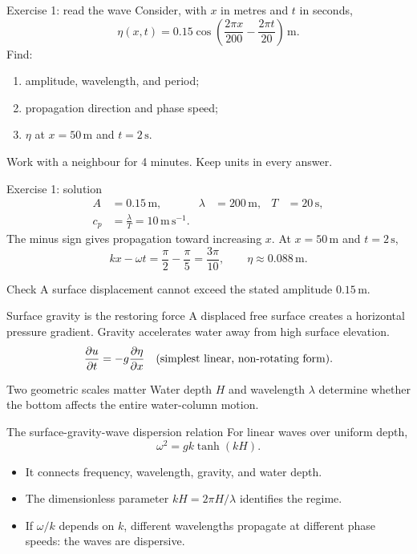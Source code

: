 \documentclass[aspectratio=169]{beamer}
\newcommand{\unit}[1]{\,\mathrm{#1}}
\begin{document}
\begin{frame}{Exercise 1: read the wave}
  Consider, with $x$ in metres and $t$ in seconds,
  \[
    \eta(x,t)=0.15\cos\left(\frac{2\pi x}{200}-\frac{2\pi t}{20}\right)\unit{m}.
  \]
  Find:
  \begin{enumerate}
    \item amplitude, wavelength, and period;
    \item propagation direction and phase speed;
    \item $\eta$ at $x=50\unit{m}$ and $t=2\unit{s}$.
  \end{enumerate}
  \vfill
  Work with a neighbour for 4 minutes. Keep units in every answer.
\end{frame}

\begin{frame}{Exercise 1: solution}
  \begin{align*}
    A &= 0.15\unit{m}, & \lambda &= 200\unit{m}, & T &= 20\unit{s},\\
    c_p &= \frac{\lambda}{T}=10\unit{m\,s^{-1}}.&&&
  \end{align*}
  The minus sign gives propagation toward increasing $x$.
  At $x=50\unit{m}$ and $t=2\unit{s}$,
  \[
    kx-\omega t=\frac{\pi}{2}-\frac{\pi}{5}=\frac{3\pi}{10},
    \qquad
    \eta\approx0.088\unit{m}.
  \]
  \begin{alertblock}{Check}
    A surface displacement cannot exceed the stated amplitude $0.15\unit{m}$.
  \end{alertblock}
\end{frame}

\begin{frame}{Surface gravity is the restoring force}
  A displaced free surface creates a horizontal pressure gradient.
  Gravity accelerates water away from high surface elevation.
  \[
    \frac{\partial u}{\partial t}=-g\frac{\partial\eta}{\partial x}
    \quad\hbox{(simplest linear, non-rotating form).}
  \]
  \begin{block}{Two geometric scales matter}
    Water depth $H$ and wavelength $\lambda$ determine whether the bottom affects
    the entire water-column motion.
  \end{block}
\end{frame}

\begin{frame}{The surface-gravity-wave dispersion relation}
  For linear waves over uniform depth,
  \[
    \boxed{\omega^2=gk\tanh(kH)}.
  \]
  \begin{itemize}
    \item It connects frequency, wavelength, gravity, and water depth.
    \item The dimensionless parameter $kH=2\pi H/\lambda$ identifies the regime.
    \item If $\omega/k$ depends on $k$, different wavelengths propagate at
      different phase speeds: the waves are dispersive.
  \end{itemize}
\end{frame}
\end{document}
